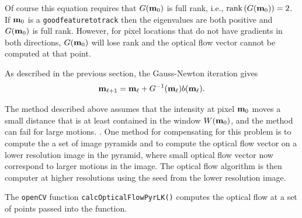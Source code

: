 Of course this equation requires that $G(\mathbf{m}_0)$ is full rank, i.e., $\text{rank}\left(G(\mathbf{m}_0)\right)=2$.  If $\mathbf{m}_0$ is a \texttt{goodfeaturetotrack} then the eigenvalues are both positive and $G(\mathbf{m}_0)$ is full rank.  However, for pixel locations that do not have gradients in both directions, $G(\mathbf{m}_0)$ will lose rank and the optical flow vector cannot be computed at that point.  

As described in the previous section, the Gauss-Newton iteration gives
\[
\mathbf{m}_{\ell+1} = \mathbf{m}_\ell + G^{-1}(\mathbf{m}_\ell) b(\mathbf{m}_\ell).
\]

The method described above assumes that the intensity at pixel $\mathbf{m}_0$ moves a small distance that is at least contained in the window $W(\mathbf{m}_0)$, and the method can fail for large motions.  
.
One method for compensating for this problem is to compute the a set of image pyramids and to compute the optical flow vector on a lower resolution image in the pyramid, where small optical flow vector now correspond to larger motions in the image.  The optical flow algorithm is then computer at higher resolutions using the seed from the lower resolution image.  

The \texttt{openCV} function \texttt{calcOpticalFlowPyrLK()} computes the optical flow at a set of points passed into the function.

